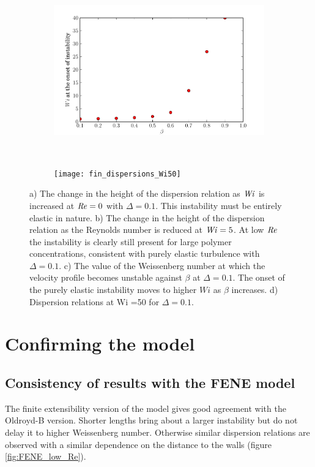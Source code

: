 \documentclass{jfm}
\newcommand\Wi{\mbox{\textit{Wi}}}
\newcommand\Rey{\mbox{\textit{Re}}}  %
\begin{document}
\begin{figure}
\begin{subfigure}[b]{0.48\textwidth}
    \centering
    \includegraphics[width=\textwidth]{KH_onset_beta_Wi}
    \caption{}
    \label{fig:KH_elastic_onset}
\end{subfigure}
~
\begin{subfigure}[b]{0.48\textwidth}
    \centering
    \texttt{[image: fin\_dispersions\_Wi50]}
    \caption{}
    \label{fig:KH_finite_dispersions}
\end{subfigure}
\caption{
a) The change in the height of the dispersion relation as $\Wi$ is increased at
$\Rey = 0$ with $\Delta = 0.1$. This instability must be entirely elastic in
nature. b) The change in the height of the dispersion relation as the Reynolds
number is reduced at $\Wi=5$. At low $\Rey$ the instability is clearly still
present for large polymer concentrations, consistent with purely elastic
turbulence with $\Delta = 0.1$.  c) The value of the Weissenberg number at
which the velocity profile becomes unstable against $\beta$ at $\Delta = 0.1$.
The onset of the purely elastic instability moves to higher $Wi$ as $\beta$
increases. d) Dispersion relations at Wi =50 for $\Delta =0.1$.
}
\end{figure}

\section{Confirming the model}

\subsection{Consistency of results with the FENE model}

The finite extensibility version of the model gives good agreement with the
Oldroyd-B version. Shorter lengths bring about a larger instability but do not
delay it to higher Weissenberg number. Otherwise similar dispersion relations
are observed with a similar dependence on the distance to the walls (figure
\ref{fig:FENE_low_Re}).
\end{document}
